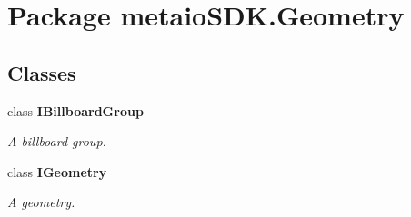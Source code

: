 \section{Package metaio\-S\-D\-K.\-Geometry}
\label{namespacemetaio_s_d_k_1_1_geometry}
\subsection*{Classes}
\begin{DoxyCompactItemize}
\item 
class {\bf I\-Billboard\-Group}
\begin{DoxyCompactList}\small\item\em A billboard group. \end{DoxyCompactList}\item 
class {\bf I\-Geometry}
\begin{DoxyCompactList}\small\item\em A geometry. \end{DoxyCompactList}\end{DoxyCompactItemize}
